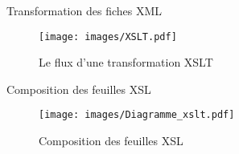\begin{frame}{Transformation des fiches XML}
	
	\begin{figure}
	  \centering
	  \texttt{[image: images/XSLT.pdf]}
	  \caption{Le flux d'une transformation XSLT}
	\end{figure}
\end{frame}


\begin{frame}{Composition des feuilles XSL}
	
	\begin{figure}
	  \centering
	  \texttt{[image: images/Diagramme\_xslt.pdf]}
	  \caption{Composition des feuilles XSL}
	\end{figure}
\end{frame}
